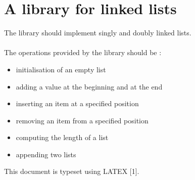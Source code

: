 \section{A library for linked lists}
{The library should implement singly and doubly linked lists.}\\\\
{The operations provided by the library should be : }
\begin{itemize}
    \item initialisation of an empty list
    \item adding a value at the beginning and at the end
    \item inserting an item at a specified position
    \item removing an item from a specified position
    \item computing the length of a list
    \item appending two lists
\end{itemize}
{This document is typeset using LATEX [1].}